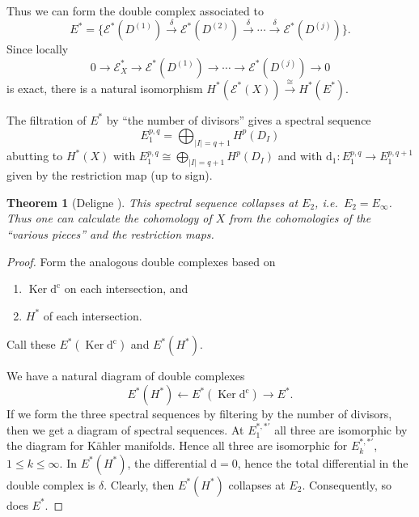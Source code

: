 \documentclass[11pt]{amsart}
\theoremstyle{plain}
\newtheorem{theorem}{Theorem}[section]
\theoremstyle{definition}
\DeclareMathOperator{\Ker}{Ker}
\newcommand{\sE}{\mathscr{E}}
\newcommand{\dd}{\mathrm{d}}
\newcommand{\dc}{\mathrm{d}^{\mathrm{c}}}
\begin{document}
Thus we can form the double complex associated to
\[
E^{*} = \{\sE^{*}(D^{(1)}) \xrightarrow{\delta} \sE^{*}(D^{(2)}) \xrightarrow{\delta} \cdots \xrightarrow{\delta} \sE^{*}(D^{(j)})\}.
\]
Since locally
\[
0 \to \sE^{*}_{X} \to \sE^{*}(D^{(1)}) \to \cdots \to \sE^{*}(D^{(j)}) \to 0
\]
is exact, there is a natural isomorphism $H^{*}(\sE^{*}(X)) \xrightarrow{\cong} H^{*}(E^{*})$.

The filtration of $E^{*}$ by ``the number of divisors'' gives a spectral sequence
\[
E^{p,q}_{1} = \bigoplus_{|I|=q+1} H^{p}(D_{I})
\]
abutting to $H^{*}(X)$ with $E^{p,q}_{1} \cong \bigoplus_{|I|=q+1} H^{p}(D_{I})$ and with $\dd_{1} \colon E^{p,q}_{1} \to E^{p,q+1}_{1}$ given by the restriction map (up to sign).

\begin{theorem}[Deligne \cite{D1}]
This spectral sequence collapses at $E_{2}$, i.e.\ $E_{2} = E_{\infty}$. Thus one can calculate the cohomology of $X$ from the cohomologies of the ``various pieces'' and the restriction maps.
\end{theorem}

\begin{proof}
Form the analogous double complexes based on
\begin{enumerate}
\item[1)] $\Ker \dc$ on each intersection, and
\item[2)] $H^{*}$ of each intersection.
\end{enumerate}
Call these $E^{*}(\Ker \dc)$ and $E^{*}(H^{*})$.

We have a natural diagram of double complexes
\[
E^{*}(H^{*}) \xleftarrow{} E^{*}(\Ker \dc) \xrightarrow{} E^{*}.
\]
If we form the three spectral sequences by filtering by the number of divisors, then we get a diagram of spectral sequences. At $E^{*,*'}_{1}$ all three are isomorphic by the diagram for K\"ahler manifolds. Hence all three are isomorphic for $E^{*,*'}_{k}$, $1 \le k \le \infty$. In $E^{*}(H^{*})$, the differential $\dd = 0$, hence the total differential in the double complex is $\delta$. Clearly, then $E^{*}(H^{*})$ collapses at $E_{2}$. Consequently, so does $E^{*}$.
\end{proof}
\end{document}

